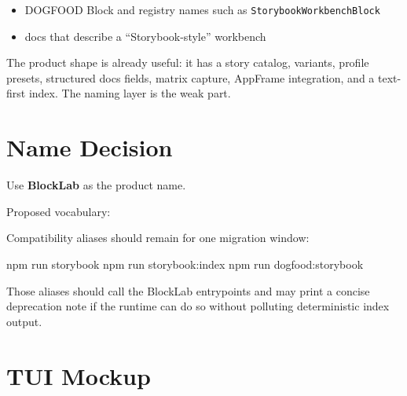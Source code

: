 \begin{itemize}
  visible labels such as \texttt{B\allowbreak{}i\allowbreak{}j\allowbreak{}o\allowbreak{}u\allowbreak{} \allowbreak{}S\allowbreak{}t\allowbreak{}o\allowbreak{}r\allowbreak{}y\allowbreak{}b\allowbreak{}o\allowbreak{}o\allowbreak{}k}, \texttt{S\allowbreak{}t\allowbreak{}o\allowbreak{}r\allowbreak{}y\allowbreak{}b\allowbreak{}o\allowbreak{}o\allowbreak{}k}, and \texttt{S\allowbreak{}t\allowbreak{}o\allowbreak{}r\allowbreak{}y\allowbreak{}b\allowbreak{}o\allowbreak{}o\allowbreak{}k\allowbreak{} \allowbreak{}W\allowbreak{}o\allowbreak{}r\allowbreak{}k\allowbreak{}s\allowbreak{}t\allowbreak{}a\allowbreak{}t\allowbreak{}i\allowbreak{}o\allowbreak{}n}
\item
  DOGFOOD Block and registry names such as \texttt{S\allowbreak{}t\allowbreak{}o\allowbreak{}r\allowbreak{}y\allowbreak{}b\allowbreak{}o\allowbreak{}o\allowbreak{}k\allowbreak{}W\allowbreak{}o\allowbreak{}r\allowbreak{}k\allowbreak{}b\allowbreak{}e\allowbreak{}n\allowbreak{}c\allowbreak{}h\allowbreak{}B\allowbreak{}l\allowbreak{}o\allowbreak{}c\allowbreak{}k}
\item
  docs that describe a ``Storybook-style'' workbench
\end{itemize}

The product shape is already useful: it has a story catalog, variants, profile presets, structured docs fields, matrix capture, AppFrame integration, and a text-first index. The naming layer is the weak part.

\section{Name Decision}\label{record-134-name-decision}

Use \textbf{BlockLab} as the product name.

Proposed vocabulary:



Compatibility aliases should remain for one migration window:

\begin{CodeBlock}
npm run storybook
npm run storybook:index
npm run dogfood:storybook
\end{CodeBlock}

Those aliases should call the BlockLab entrypoints and may print a concise deprecation note if the runtime can do so without polluting deterministic index output.

\section{TUI Mockup}\label{record-134-tui-mockup}


